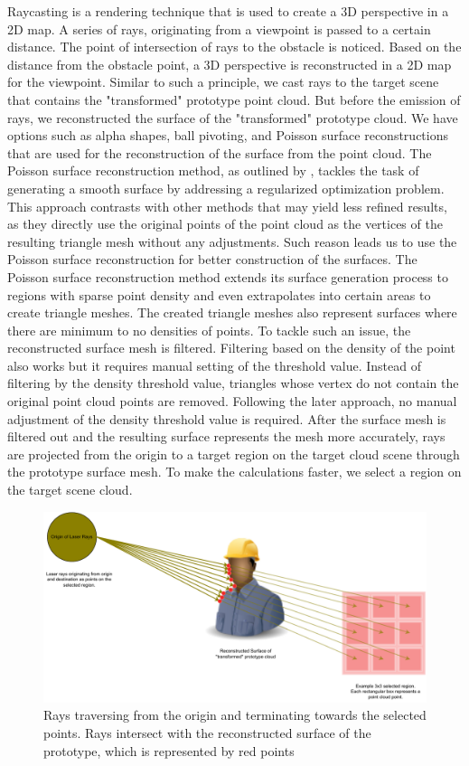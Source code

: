 Raycasting is a rendering technique that is used to create a 3D perspective in a 2D map. A series of rays, originating from a viewpoint is passed to a certain distance. The point of intersection of rays to the obstacle is noticed. Based on the distance from the obstacle point, a 3D perspective is reconstructed in a 2D map for the viewpoint. Similar to such a principle, we cast rays to the target scene that contains the "transformed" prototype point cloud. But before the emission of rays, we reconstructed the surface of the "transformed" prototype cloud. We have options such as alpha shapes, ball pivoting, and Poisson surface reconstructions that are used for the reconstruction of the surface from the point cloud. The Poisson surface reconstruction method, as outlined by \parencite{kazhdan2006}, tackles the task of generating a smooth surface by addressing a regularized optimization problem. This approach contrasts with other methods that may yield less refined results, as they directly use the original points of the point cloud as the vertices of the resulting triangle mesh without any adjustments. Such reason leads us to use the Poisson surface reconstruction for better construction of the surfaces. The Poisson surface reconstruction method extends its surface generation process to regions with sparse point density and even extrapolates into certain areas to create triangle meshes. The created triangle meshes also represent surfaces where there are minimum to no densities of points. To tackle such an issue, the reconstructed surface mesh is filtered. Filtering based on the density of the point also works but it requires manual setting of the threshold value. Instead of filtering by the density threshold value, triangles whose vertex do not contain the original point cloud points are removed. Following the later approach, no manual adjustment of the density threshold value is required.
After the surface mesh is filtered out and the resulting surface represents the mesh more accurately, rays are projected from the origin to a target region on the target cloud scene through the prototype surface mesh. To make the calculations faster, we select a region on the target scene cloud.

\begin{figure}[htbp]
    \centering
    \includegraphics[width=1\linewidth]{97_graphics/concepts/raycasting.pdf}
    \caption{Rays traversing from the origin and terminating towards the selected points. Rays intersect with the reconstructed surface of the prototype, which is represented by red points}
    \label{fig:raycasting}
\end{figure}

